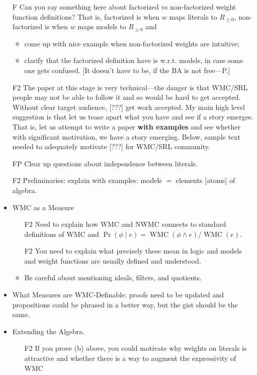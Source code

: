 \documentclass{article}
\theoremstyle{definition}
\theoremstyle{remark}
\DeclareMathOperator{\WMC}{WMC}
\begin{document}
\begin{itemize}
\item[F] Can you say something here about factorized vs non-factorized
  weight function definitions? That is, factorized is when $w$ maps literals to
  $R_{\ge 0}$, non-factorized is when $w$ maps models to $R_{\ge 0}$ and
  \begin{itemize}
  \item come up with nice example when non-factorized weights are intuitive;
  \item clarify that the factorized definition have is w.r.t. models, in case some
    one gets confused. [It doesn't have to be, if the BA is not free---P.]
  \end{itemize}
\item[F2] The paper at this stage is very technical---the danger is that WMC/SRL
  people may not be able to follow it and so would be hard to get accepted.
  Without clear target audience, [???] get work accepted. My main high level
  suggestion is that let us tease apart what you have and see if a story
  emerges. That is, let us attempt to write a paper {\bf with examples} and
  see whether with significant motivation, we have a story emerging. Below,
  sample text needed to adequately motivate [???] for WMC/SRL community.
\item[FP] Clear up questions about independence between literals.
\item[F2] Preliminaries: explain with examples: models $=$ elements [atoms] of
  algebra.
\item WMC as a Measure
  \begin{itemize}
  \item[F2] Need to explain how WMC and NWMC connects to standard definitions of
    WMC and $\Pr(\phi \mid e) = \WMC(\phi \land e)/\WMC(e)$.
  \item[F2] You need to explain what precisely these mean in logic and models
    and weight functions are usually defined and understood.
  \item Be careful about mentioning ideals, filters, and quotients.
  \end{itemize}
\item What Measures are WMC-Definable: proofs need to be updated and
  propositions could be phrased in a better way, but the gist should be the
  same.
\item Extending the Algebra.
  \begin{itemize}
  \item[F2] If you prove (b) above, you could motivate why weights on literals
    is attractive and whether there is a way to augment the expressivity of WMC

\end{itemize}
\end{itemize}
\end{document}
